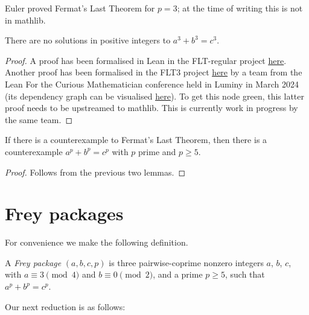 Euler proved Fermat's Last Theorem for $p=3$; at the time of writing this is not in mathlib.

\begin{lemma}\label{fermatLastTheoremThree}\leanok
{}
  There are no solutions in positive integers to $a^3+b^3=c^3$.
\end{lemma}
\begin{proof}
  A proof has been formalised in Lean in the FLT-regular project \href{https://github.com/leanprover-community/flt-regular/blob/861b7df057140b45b8bb7d30d33426ffbbdda52b/FltRegular/FltThree/FltThree.lean#L698}{\underline{here}}. 
  Another proof has been formalised in the FLT3 project \href{https://github.com/riccardobrasca/flt3}{\underline{here}} by a team from the Lean For the Curious Mathematician conference held in Luminy in March 2024 
  (its dependency graph can be visualised \href{https://pitmonticone.github.io/FLT3/blueprint/dep_graph_document.html}{\underline{here}}). 
  To get this node green, this latter proof needs to be upstreamed to mathlib. This is currently work in progress by the same team.
\end{proof}

\begin{corollary}\label{FLT.p_ge_5_counterexample_of_not_FermatLastTheorem}\leanok If there is a counterexample to Fermat's Last Theorem, then there is a counterexample $a^p+b^p=c^p$ with $p$ prime and $p\geq 5$.
\end{corollary}
\begin{proof}\leanok Follows from the previous two lemmas.\end{proof}

\section{Frey packages}

For convenience we make the following definition.

\begin{definition}\label{FLT.FreyPackage}\leanok A \emph{Frey package} $(a,b,c,p)$ is three pairwise-coprime nonzero integers $a$, $b$, $c$, with $a\equiv3\pmod4$ and $b\equiv0\pmod2$, and a prime $p\geq5$, such that $a^p+b^p=c^p$.\end{definition}

Our next reduction is as follows:

